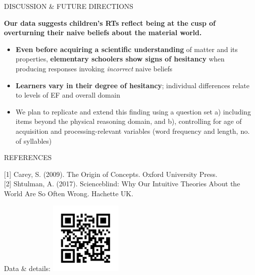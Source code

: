 \documentclass[final]{beamer}
\newlength{\colwidth}
\newlength{\widecolwidth}
\begin{document}
\begin{frame}[t]
\begin{columns}[t]
\begin{column}{\widecolwidth}
\begin{block}{DISCUSSION \& FUTURE DIRECTIONS}
	\begin{tcolorbox}[
		colback=mycolor,
		colframe=mycolor,
		coltext=white,
		boxsep=4pt,
		left=3mm,
		right=3mm,
		top=4mm,
		bottom=4mm,
		arc=5mm,
		auto outer arc,
		boxrule=4pt,
		width=\dimexpr\linewidth-2\fboxsep\relax,
		]
		\centering
		\textbf{\LARGE Our data suggests children's RTs reflect being at the cusp of overturning their naive beliefs about the material world.}
	\end{tcolorbox}
	
    \begin{itemize}
      \item \textbf{Even before acquiring a scientific understanding} of matter and its properties, \textbf{elementary schoolers show signs of hesitancy} when producing responses invoking \emph{incorrect} naive beliefs
      \item \textbf{Learners vary in their degree of hesitancy}; individual differences relate to levels of EF and overall domain
      \item We plan to replicate and extend this finding using a question set a) including items beyond the physical reasoning domain, and b), controlling for age of acquisition and processing-relevant variables (word frequency and length, no. of syllables)
    \end{itemize}
\end{block}

\begin{block}{\small{REFERENCES}}
\begin{minipage}{0.925\textwidth}
  \footnotesize
  [1] Carey, S. (2009). The Origin of Concepts. Oxford University Press.\\[.5ex]
  [2] Shtulman, A. (2017). Scienceblind: Why Our Intuitive Theories About the World Are So Often Wrong. Hachette UK.
  \end{minipage}%
  \begin{minipage}{0.075\textwidth}
      \centering
      \footnotesize{Data \& details:}
    \href{https://osf.io/bdmuh/}{\includegraphics[height=3.5cm]{images/qrcode.png}}
  \end{minipage}
\end{block}

\end{column}
\end{columns}
\end{frame}
\end{document}
